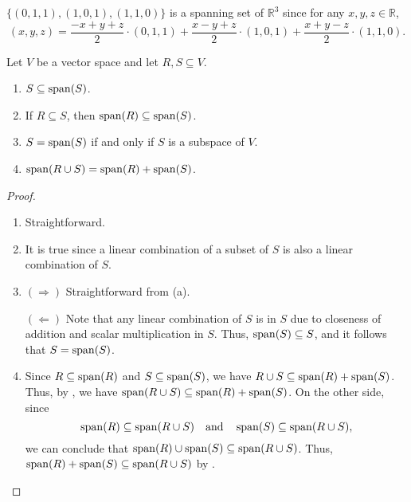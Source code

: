 \begin{example}
  $\{(0, 1, 1), (1, 0, 1), (1, 1, 0)\}$ is a spanning set of $\mathbb{R}^3$
  since for any $x, y, z \in \mathbb{R}$,
  \begin{equation*}
    (x, y, z)
      = \frac{-x+y+z}{2} \cdot (0, 1, 1)
      + \frac{x-y+z}{2} \cdot (1, 0, 1)
      + \frac{x+y-z}{2} \cdot (1, 1, 0).
  \end{equation*}
\end{example}

\begin{proposition}\label{prop:span}
  Let $V$ be a vector space and let $R, S \subseteq V$.
  \begin{enumerate}
    \item $S \subseteq \operatorname{span}(S)$.
    \item If $R \subseteq S$, then $\operatorname{span}(R) \subseteq \operatorname{span}(S)$.
    \item $S = \operatorname{span}(S)$ if and only if $S$ is a subspace of $V$.
    \item $\operatorname{span}(R \cup S) = \operatorname{span}(R) + \operatorname{span}(S)$.
  \end{enumerate}
\end{proposition}
\begin{proof}
  \leavevmode
  \begin{enumerate}
    \item Straightforward.
    \item It is true since a linear combination of a subset of $S$ is also a
      linear combination of $S$.
    \item $(\Rightarrow)$ Straightforward from  (a).

      $(\Leftarrow)$ Note that any linear combination of $S$ is in $S$ due to
      closeness of addition and scalar multiplication in $S$.
      Thus, $\operatorname{span}(S) \subseteq S$, and it follows that $S = \operatorname{span}(S)$.
    \item Since $R \subseteq \operatorname{span}(R)$ and $S \subseteq \operatorname{span}(S)$, we have
      $R \cup S \subseteq \operatorname{span}(R) + \operatorname{span}(S)$. Thus, by , we have
      $\operatorname{span}(R \cup S) \subseteq \operatorname{span}(R) + \operatorname{span}(S)$.
      On the other side, since
      \begin{equation*}
        \operatorname{span}(R) \subseteq \operatorname{span}(R \cup S)
        \quad \text{and} \quad
        \operatorname{span}(S) \subseteq \operatorname{span}(R \cup S),
      \end{equation*}
      we can conclude that $\operatorname{span}(R) \cup \operatorname{span}(S) \subseteq \operatorname{span}(R \cup S)$.
      Thus, $\operatorname{span}(R) + \operatorname{span}(S) \subseteq \operatorname{span}(R \cup S)$
      by . \qedhere
  \end{enumerate}
\end{proof}

